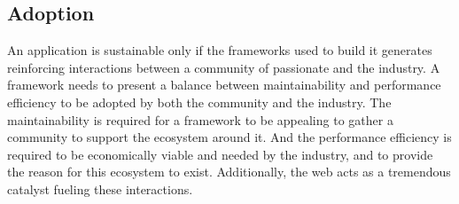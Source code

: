 









\subsection{Adoption}

An application is sustainable only if the frameworks used to build it generates reinforcing interactions between a community of passionate and the industry.
A framework needs to present a balance between maintainability and performance efficiency to be adopted by both the community and the industry.
The maintainability is required for a framework to be appealing to gather a community to support the ecosystem around it.
And the performance efficiency is required to be economically viable and needed by the industry, and to provide the reason for this ecosystem to exist.
Additionally, the web acts as a tremendous catalyst fueling these interactions.

